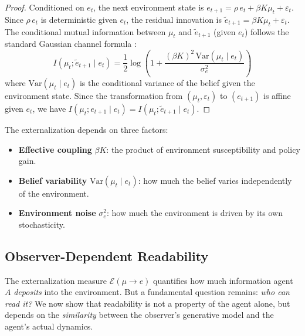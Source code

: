 \documentclass[runningheads]{llncs}
\begin{document}
\begin{proof}
Conditioned on $e_t$, the next environment state is $e_{t+1} = \rho \, e_t + \beta K \mu_t + \varepsilon_t$. Since $\rho \, e_t$ is deterministic given $e_t$, the residual innovation is $\tilde{e}_{t+1} = \beta K \mu_t + \varepsilon_t$. The conditional mutual information between $\mu_t$ and $\tilde{e}_{t+1}$ (given $e_t$) follows the standard Gaussian channel formula \cite{cover2006elements}:
\[
I(\mu_t; \tilde{e}_{t+1} \mid e_t) = \frac{1}{2} \log \left( 1 + \frac{(\beta K)^2 \, \mathrm{Var}(\mu_t \mid e_t)}{\sigma_e^2} \right)
\]
where $\mathrm{Var}(\mu_t \mid e_t)$ is the conditional variance of the belief given the environment state. Since the transformation from $(\mu_t, \varepsilon_t)$ to $(e_{t+1})$ is affine given $e_t$, we have $I(\mu_t; e_{t+1} \mid e_t) = I(\mu_t; \tilde{e}_{t+1} \mid e_t)$.
\end{proof}

The externalization depends on three factors:
\begin{itemize}
    \item \textbf{Effective coupling} $\beta K$: the product of environment susceptibility and policy gain.
    \item \textbf{Belief variability} $\mathrm{Var}(\mu_t \mid e_t)$: how much the belief varies independently of the environment.
    \item \textbf{Environment noise} $\sigma_e^2$: how much the environment is driven by its own stochasticity.
\end{itemize}

\subsection{Observer-Dependent Readability}
\label{sec:readability}

The externalization measure $\mathcal{E}(\mu \to e)$ quantifies how much information agent $A$ \emph{deposits} into the environment. But a fundamental question remains: \emph{who can read it?} We now show that readability is not a property of the agent alone, but depends on the \emph{similarity} between the observer's generative model and the agent's actual dynamics.
\end{document}
